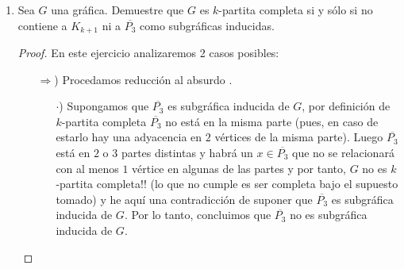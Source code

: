 \documentclass{article}
\begin{document}
\begin{enumerate}
\begin{proof}
      \textcolor{blue}{Caso 2:} Si $G$ es un \'arbol, esto nos indica que $G$ es
      $1-$conexa, y es por eso que se considera este caso como el m\'inimo para el
      que se cumplir\'a la condici\'on a demostrar. Sabemos por el teorema de
      caracterizaci\'on de \'arboles que cada arista en $G$ ser\'a un puente, y
      por el resultado previamente mostrado sabemos que existe una trayectoria $T$
      en $G$ de orden exactamente $3$, as\'i $T$ es claramente $P_3$ y concluimos
      $P_3$ es subg\'afica inducida de $G$.

      De los casos anteriores concluimos que el enunciado es verdadero.
    \end{proof}

    \item {}

        Sea $G$ una gr\'afica. Demuestre que $G$ es $k$-partita completa si y s\'olo si no contiene a $K_{k+1}$ ni a $\overline{P_3}$ como subgr\'aficas inducidas.

        \begin{proof}
        En este ejercicio analizaremos 2 casos posibles:

            \begin{itemize}
                \item[$\Rightarrow$)] Procedamos reducción al absurdo .

                    \begin{itemize}
                        \item[$\cdot$)] Supongamos que $\overline{P_3}$ es subgr\'afica inducida
                        de $G$, por definición de $k$-partita completa $\overline{P_3}$ no está
                        en la misma parte (pues, en caso de estarlo hay una adyacencia en $2$
                        vértices de la misma parte). Luego $\overline{P_3}$ está en $2$ o $3$
                        partes distintas y habrá un $x \in \overline{P_3}$ que no se relacionará
                        con al menos $1$ vértice en algunas de las partes y por tanto, $G$ no es
                        $k$-partita completa!! (lo que no cumple es ser completa bajo el supuesto
                        tomado) y he aquí una contradicción de suponer que $\overline{P_3}$ es
                        subgr\'afica inducida de $G$. Por lo tanto, concluimos que $\overline{P_3}$
                        no es subgr\'afica inducida de $G$.


\end{itemize}
\end{itemize}
\end{proof}
\end{enumerate}
\end{document}
